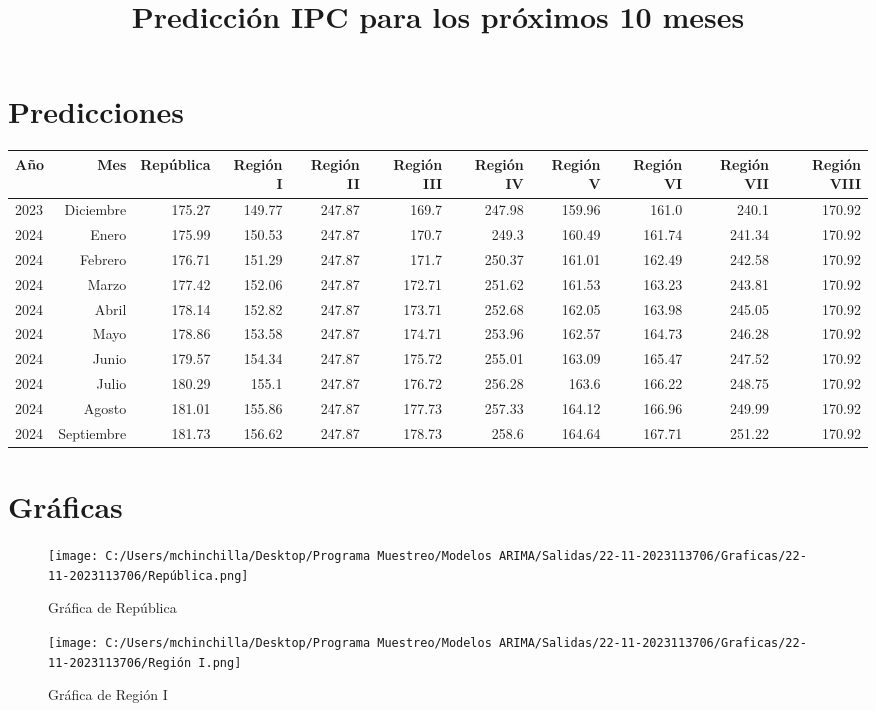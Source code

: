 \documentclass{article}%
\title{Predicción IPC para los próximos 10 meses}%
\date{}%
\begin{document}
%
\normalsize%
\maketitle%
\section{Predicciones}%
\label{sec:Predicciones}%
\begin{longtable}{|l r|r|r|r|r|r|r|r|r|r|}%
\hline%
Año&Mes&República&Región I&Región II&Región III&Región IV&Región V&Región VI&Región VII&Región VIII\\%
\hline%
2023&Diciembre&175.27&149.77&247.87&169.7&247.98&159.96&161.0&240.1&170.92\\%
2024&Enero&175.99&150.53&247.87&170.7&249.3&160.49&161.74&241.34&170.92\\%
2024&Febrero&176.71&151.29&247.87&171.7&250.37&161.01&162.49&242.58&170.92\\%
2024&Marzo&177.42&152.06&247.87&172.71&251.62&161.53&163.23&243.81&170.92\\%
2024&Abril&178.14&152.82&247.87&173.71&252.68&162.05&163.98&245.05&170.92\\%
2024&Mayo&178.86&153.58&247.87&174.71&253.96&162.57&164.73&246.28&170.92\\%
2024&Junio&179.57&154.34&247.87&175.72&255.01&163.09&165.47&247.52&170.92\\%
2024&Julio&180.29&155.1&247.87&176.72&256.28&163.6&166.22&248.75&170.92\\%
2024&Agosto&181.01&155.86&247.87&177.73&257.33&164.12&166.96&249.99&170.92\\%
2024&Septiembre&181.73&156.62&247.87&178.73&258.6&164.64&167.71&251.22&170.92\\%
\hline%
\end{longtable}

%
\section{Gráficas}%
\label{sec:Grficas}%


\begin{figure}[H]%
\centering%
\texttt{[image: C:/Users/mchinchilla/Desktop/Programa Muestreo/Modelos ARIMA/Salidas/22-11-2023113706/Graficas/22-11-2023113706/República.png]}%
\caption{Gráfica de República}%
\end{figure}

%


\begin{figure}[H]%
\centering%
\texttt{[image: C:/Users/mchinchilla/Desktop/Programa Muestreo/Modelos ARIMA/Salidas/22-11-2023113706/Graficas/22-11-2023113706/Región I.png]}%
\caption{Gráfica de Región I}%
\end{figure}
\end{document}
